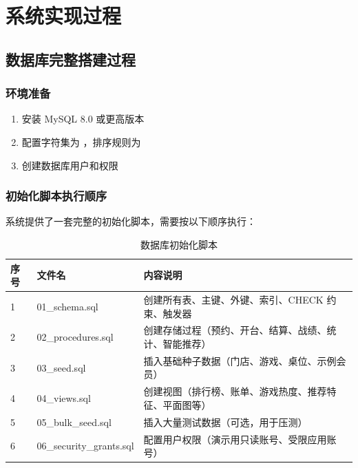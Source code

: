 \chapter{系统实现过程}

\section{数据库完整搭建过程}

\subsection{环境准备}

\begin{enumerate}
  \item 安装 MySQL 8.0 或更高版本
  \item 配置字符集为 ，排序规则为 
  \item 创建数据库用户和权限
\end{enumerate}

\subsection{初始化脚本执行顺序}

系统提供了一套完整的初始化脚本，需要按以下顺序执行：

\begin{table}[H]
  \centering
  \caption{数据库初始化脚本}
  \label{tab:init_scripts}
  \begin{tabularx}{\textwidth}{|l|l|X|}
    \hline
    \textbf{序号} & \textbf{文件名} & \textbf{内容说明} \\
    \hline
    1 & 01\_schema.sql & 创建所有表、主键、外键、索引、CHECK 约束、触发器 \\
    \hline
    2 & 02\_procedures.sql & 创建存储过程（预约、开台、结算、战绩、统计、智能推荐） \\
    \hline
    3 & 03\_seed.sql & 插入基础种子数据（门店、游戏、桌位、示例会员） \\
    \hline
    4 & 04\_views.sql & 创建视图（排行榜、账单、游戏热度、推荐特征、平面图等） \\
    \hline
    5 & 05\_bulk\_seed.sql & 插入大量测试数据（可选，用于压测） \\
    \hline
    6 & 06\_security\_grants.sql & 配置用户权限（演示用只读账号、受限应用账号） \\
    \hline
  \end{tabularx}
\end{table}

